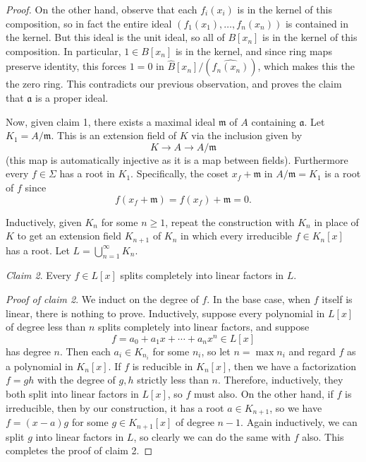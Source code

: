 \begin{proof}
On the other hand, observe that each $ f_i(x_i)$ is in the kernel of this composition, so in fact the entire ideal $ (f_1(x_1), \dotsc, f_n(x_n))$ is contained in the kernel. But this ideal is the unit ideal, so all of $ B[x_n]$ is in the kernel of this composition. In particular, $ 1 \in B[x_n]$ is in the kernel, and since ring maps preserve identity, this forces $ 1 = 0$ in $ \hat{B}[x_n]/(\widehat{f_n(x_n)})$, which makes this the the zero ring. This contradicts our previous observation, and proves the claim that $ \mathfrak{a}$ is a proper ideal.

Now, given claim 1, there exists a maximal ideal $ \mathfrak{m}$ of $ A$ containing $ \mathfrak{a}$. Let $ K_1 = A/\mathfrak{m}$. This is an extension field of $ K$ via the inclusion given by
\[ K \to A \to A/\mathfrak{m} \]
(this map is automatically injective as it is a map between fields). Furthermore every $ f \in \Sigma$ has a root in $ K_1$. Specifically, the coset $ x_f + \mathfrak{m}$ in $ A/\mathfrak{m} = K_1$ is a root of $ f$ since
\[ f(x_f + \mathfrak{m}) = f(x_f) + \mathfrak{m} = 0. \]

Inductively, given $ K_n$ for some $ n \geq 1$, repeat the construction with $ K_n$ in place of $ K$ to get an extension field $ K_{n+1}$ of $ K_n$ in which every irreducible $ f \in K_n[x]$ has a root. Let $ L = \bigcup_{n = 1}^{\infty} K_n$.

\emph{Claim 2}. Every $ f \in L[x]$ splits completely into linear factors in $ L$.

\emph{Proof of claim 2}. We induct on the degree of $ f$. In the base case, when $ f$ itself is linear, there is nothing to prove. Inductively, suppose every polynomial in $ L[x]$ of degree less than $ n$ splits completely into linear factors, and suppose
\[ f = a_0 + a_1x + \dotsb + a_nx^n \in L[x] \]
has degree $ n$. Then each $ a_i \in K_{n_i}$ for some $ n_i$, so let $ n = \max n_i$ and regard $ f$ as a polynomial in $ K_n[x]$. If $ f$ is reducible in $ K_n[x]$, then we have a factorization $ f = gh$ with the degree of $ g, h$ strictly less than $ n$. Therefore, inductively, they both split into linear factors in $ L[x]$, so $ f$ must also. On the other hand, if $ f$ is irreducible, then by our construction, it has a root $ a\in K_{n+1}$, so we have $ f = (x - a) g$ for some $ g \in K_{n+1}[x]$ of degree $ n - 1$. Again inductively, we can split $ g$ into linear factors in $ L$, so clearly we can do the same with $ f$ also. This completes the proof of claim 2.


\end{proof}
